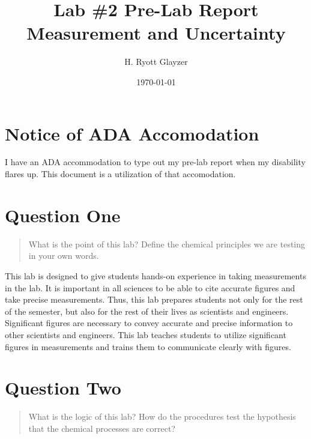 \documentclass[11pt, letterpaper]{article}
\begin{document}
\title{Lab \#2 Pre-Lab Report \\ \large Measurement and Uncertainty}
\author{H. Ryott Glayzer}
\date{\today}

\maketitle

\section*{Notice of ADA Accomodation}
I have an ADA accommodation to type out my pre-lab report when my disability flares up.
This document is a utilization of that accomodation.

\section{Question One}
\begin{quote}
    What is the point of this lab? Define the chemical principles we are testing in your own words.
\end{quote}

This lab is designed to give students hands-on experience in taking measurements in the lab.
It is important in all sciences to be able to cite accurate figures and take precise measurements.
Thus, this lab prepares students not only for the rest of the semester, 
but also for the rest of their lives as scientists and engineers.
Significant figures are necessary to convey accurate and precise information to other scientists
and engineers.
This lab teaches students to utilize significant figures in measurements and trains them to communicate
clearly with figures.

\section{Question Two}
\begin{quote}
    What is the logic of this lab? How do the procedures test the hypothesis that the chemical 
    processes are correct?
\end{quote}
\end{document}
